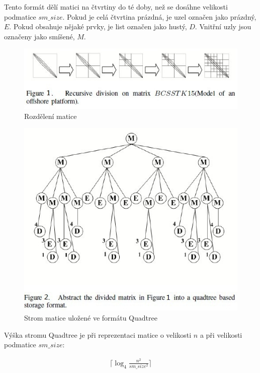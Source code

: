 Tento formát dělí matici na čtvrtiny do té doby, než se dosáhne velikosti podmatice $sm\_size$. Pokud je celá čtvrtina prázdná, je uzel označen jako prázdný, $E$. Pokud obsahuje nějaké prvky, je list označen jako hustý, $D$. Vnitřní uzly jsou označeny jako smíšené, $M$.

\begin{figure}[H]\centering
	\includegraphics[width=\textwidth]{./images/quadtree_sourceforge/figure4}
	\caption{Rozdělení matice}
	\label{fig:BSR}
\end{figure}

\begin{figure}[H]\centering
	\includegraphics[width=\textwidth]{./images/quadtree_sourceforge/figure5}
	\caption{Strom matice uložené ve formátu Quadtree}
	\label{fig:BSR}
\end{figure}

Výška stromu Quadtree je při reprezentaci matice o velikosti $n$ a při velikosti podmatice $sm\_size$:

\label{quadtreeheight}
\begin{align}
\Bigg\lceil\log_{4}\frac{n^2}{sm\_size^2}\Bigg\rceil
\end{align}


